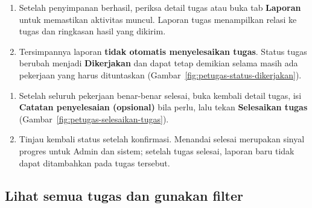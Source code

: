 \begin{enumerate}[series=petugas-selesai]
  \item Setelah penyimpanan berhasil, periksa detail tugas atau buka tab \textbf{Laporan} untuk memastikan aktivitas muncul. Laporan tugas menampilkan relasi ke tugas dan ringkasan hasil yang dikirim.
  \item Tersimpannya laporan \textbf{tidak otomatis menyelesaikan tugas}. Status tugas berubah menjadi \textbf{Dikerjakan} dan dapat tetap demikian selama masih ada pekerjaan yang harus dituntaskan (Gambar~\ref{fig:petugas-status-dikerjakan}).
\end{enumerate}


\begin{enumerate}[resume=petugas-selesai]
  \item Setelah seluruh pekerjaan benar-benar selesai, buka kembali detail tugas, isi \textbf{Catatan penyelesaian (opsional)} bila perlu, lalu tekan \textbf{Selesaikan tugas} (Gambar~\ref{fig:petugas-selesaikan-tugas}).
  \item Tinjau kembali status setelah konfirmasi. Menandai selesai merupakan sinyal progres untuk Admin dan sistem; setelah tugas selesai, laporan baru tidak dapat ditambahkan pada tugas tersebut.
\end{enumerate}



\subsection{Lihat semua tugas dan gunakan filter}

